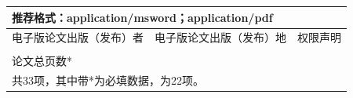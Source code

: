 \begin{longtable}{|p{}|p{}|p{}|p{}|p{}|}
\hline
\multicolumn{5}{|p{0.96\textwidth}|}{推荐格式：application/msword；application/pdf} \\
\hline
\multicolumn{2}{|p{0.40\textwidth}|}{电子版论文出版（发布）者} & \multicolumn{2}{p{0.39\textwidth}|}{电子版论文出版（发布）地} & 权限声明 \\
\hline
\multicolumn{2}{|p{0.40\textwidth}|}{} & \multicolumn{2}{p{0.39\textwidth}|}{} &  \\
\hline
论文总页数* & \multicolumn{4}{p{0.80\textwidth}|}{\pageref*{LastPage}} \\
\hline
\multicolumn{5}{|p{0.96\textwidth}|}{共33项，其中带*为必填数据，为22项。} \\
\hline
\end{longtable}

\endgroup
